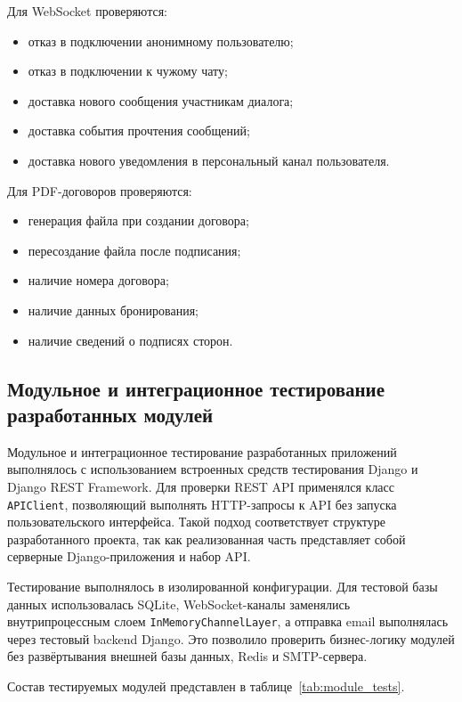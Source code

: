 Для WebSocket проверяются:
\begin{itemize}
    \item отказ в подключении анонимному пользователю;
    \item отказ в подключении к чужому чату;
    \item доставка нового сообщения участникам диалога;
    \item доставка события прочтения сообщений;
    \item доставка нового уведомления в персональный канал пользователя.
\end{itemize}

Для PDF-договоров проверяются:
\begin{itemize}
    \item генерация файла при создании договора;
    \item пересоздание файла после подписания;
    \item наличие номера договора;
    \item наличие данных бронирования;
    \item наличие сведений о подписях сторон.
\end{itemize}

\subsection{Модульное и интеграционное тестирование разработанных модулей}
Модульное и интеграционное тестирование разработанных приложений выполнялось с использованием встроенных средств тестирования Django и Django REST Framework. Для проверки REST API применялся класс \texttt{APIClient}, позволяющий выполнять HTTP-запросы к API без запуска пользовательского интерфейса. Такой подход соответствует структуре разработанного проекта, так как реализованная часть представляет собой серверные Django-приложения и набор API.

Тестирование выполнялось в изолированной конфигурации. Для тестовой базы данных использовалась SQLite, WebSocket-каналы заменялись внутрипроцессным слоем \texttt{InMemoryChannelLayer}, а отправка email выполнялась через тестовый backend Django. Это позволило проверить бизнес-логику модулей без развёртывания внешней базы данных, Redis и SMTP-сервера.

Состав тестируемых модулей представлен в таблице~\ref{tab:module_tests}.

